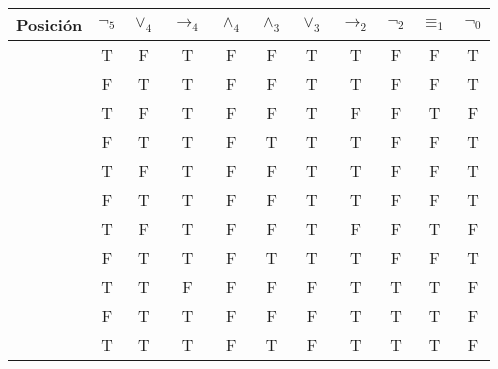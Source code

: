 \documentclass{article}
\begin{document}
\begin{center}
    \begin{NiceTabular}{|c|c|c|c|c|c|c|c|c|c|c|}
        \hline
        Posición & $\lnot_{5}$ & $\vee_{4}$ & $\to_{4}$ & $\wedge_{4}$ & $\wedge_{3}$ & $\vee_{3}$ & $\to_{2}$ & $\lnot_{2}$ & $\equiv_{1}$ & $\lnot_{0}$\\
        \hline
          &  \ttfamily T & \ttfamily F & \ttfamily T & \ttfamily F & \ttfamily F & \ttfamily T & \ttfamily T & \ttfamily F & \ttfamily F & \ttfamily T\\
          &  \ttfamily F & \ttfamily T & \ttfamily T & \ttfamily F & \ttfamily F & \ttfamily T & \ttfamily T & \ttfamily F & \ttfamily F & \ttfamily T\\
          &  \ttfamily T & \ttfamily F & \ttfamily T & \ttfamily F & \ttfamily F & \ttfamily T & \ttfamily F & \ttfamily F & \ttfamily T & \ttfamily F\\
          &  \ttfamily F & \ttfamily T & \ttfamily T & \ttfamily F & \ttfamily T & \ttfamily T & \ttfamily T & \ttfamily F & \ttfamily F & \ttfamily T\\
          &  \ttfamily T & \ttfamily F & \ttfamily T & \ttfamily F & \ttfamily F & \ttfamily T & \ttfamily T & \ttfamily F & \ttfamily F & \ttfamily T\\
          &  \ttfamily F & \ttfamily T & \ttfamily T & \ttfamily F & \ttfamily F & \ttfamily T & \ttfamily T & \ttfamily F & \ttfamily F & \ttfamily T\\
          &  \ttfamily T & \ttfamily F & \ttfamily T & \ttfamily F & \ttfamily F & \ttfamily T & \ttfamily F & \ttfamily F & \ttfamily T & \ttfamily F\\
          &  \ttfamily F & \ttfamily T & \ttfamily T & \ttfamily F & \ttfamily T & \ttfamily T & \ttfamily T & \ttfamily F & \ttfamily F & \ttfamily T\\
          &  \ttfamily T & \ttfamily T & \ttfamily F & \ttfamily F & \ttfamily F & \ttfamily F & \ttfamily T & \ttfamily T & \ttfamily T & \ttfamily F\\
          &  \ttfamily F & \ttfamily T & \ttfamily T & \ttfamily F & \ttfamily F & \ttfamily F & \ttfamily T & \ttfamily T & \ttfamily T & \ttfamily F\\
         &  \ttfamily T & \ttfamily T & \ttfamily T & \ttfamily F & \ttfamily T & \ttfamily F & \ttfamily T & \ttfamily T & \ttfamily T & \ttfamily F\\

\end{NiceTabular}
\end{center}
\end{document}
